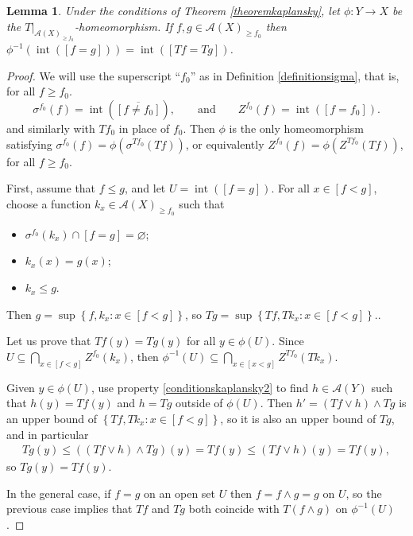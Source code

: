 \documentclass[letter,11pt]{amsart}
\theoremstyle{plain}		\newtheorem{theorem}[generalnumbering]{Theorem}
\theoremstyle{plain}		\newtheorem{corollary}[generalnumbering]{Corollary}
\theoremstyle{definition}		\newtheorem{definition}[generalnumbering]{Definition}
\theoremstyle{definition}		\newtheorem{example}[generalnumbering]{Example}
\theoremstyle{plain}		\newtheorem{proposition}[generalnumbering]{Proposition}
\theoremstyle{plain}		\newtheorem{lemma}[generalnumbering]{Lemma}
\theoremstyle{definition}
\begin{document}
\begin{lemma}\label{lemmarestrictionoflatticeisomorphismisbasic}
	Under the conditions of Theorem \ref{theoremkaplansky}, let $\phi\colon Y\to X$ be the $T|_{\mathcal{A}(X)_{\geq f_0}}$-homeomorphism. If $f,g\in\mathcal{A}(X)_{\geq{f_0}}$ then $\phi^{-1}(\operatorname{int}([f=g]))=\operatorname{int}([Tf=Tg])$.
\end{lemma}
\begin{proof}
	We will use the superscript ``$f_0$'' as in Definition \ref{definitionsigma}, that is, for all $f\geq f_0$.
	\[\sigma^{f_0}(f)=\operatorname{int}(\overline{[f\neq f_0]}),\qquad\text{and}\qquad Z^{f_0}(f)=\operatorname{int}([f=f_0]).\]
	and similarly with $Tf_0$ in place of $f_0$. Then $\phi$ is the only homeomorphism satisfying $\sigma^{f_0}(f)=\phi(\sigma^{Tf_0}(Tf))$, or equivalently $Z^{f_0}(f)=\phi(Z^{Tf_0}(Tf))$, for all $f\geq f_0$.
	
	First, assume that $f\leq g$, and let $U=\operatorname{int}([f=g])$. For all $x\in[f<g]$, choose a function $k_x\in\mathcal{A}(X)_{\geq f_0}$ such that
	\begin{itemize}
		\item $\sigma^{f_0}(k_x)\cap [f=g]=\varnothing$;
		\item $k_x(x)=g(x)$;
		\item $k_x\leq g$.
	\end{itemize}
	Then $g=\sup\left\{f,k_x:x\in[f<g]\right\}$, so $Tg=\sup\left\{Tf,Tk_x:x\in[f<g]\right\}$..
	
	Let us prove that $Tf(y)=Tg(y)$ for all $y\in\phi(U)$. Since $U\subseteq\bigcap_{x\in[f<g]}Z^{f_0}(k_x)$, then $\phi^{-1}(U)\subseteq\bigcap_{x\in[x<g]}Z^{Tf_0}(Tk_x)$.
	
	Given $y\in\phi(U)$, use property \ref{conditionskaplansky2} to find $h\in\mathcal{A}(Y)$ such that $h(y)=Tf(y)$ and $h=Tg$ outside of $\phi(U)$. Then $h'=(Tf\lor h)\land Tg$ is an upper bound of $\left\{Tf,Tk_x:x\in[f<g]\right\}$, so it is also an upper bound of $Tg$, and in particular
	\begin{align*}
	Tg(y)\leq ((Tf\lor h)\land Tg)(y)=Tf(y)\leq (Tf\lor h)(y)=Tf(y),
	\end{align*}
	so $Tg(y)=Tf(y)$.
	
	In the general case, if $f=g$ on an open set $U$ then $f=f\land g=g$ on $U$, so the previous case implies that $Tf$ and $Tg$ both coincide with $T(f\land g)$ on $\phi^{-1}(U)$.
\end{proof}
\end{document}
